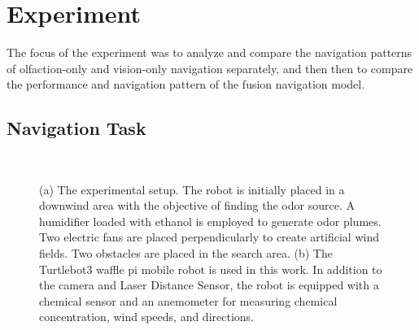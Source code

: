 
\section{Experiment}\label{Sec:fusionExperiment}

The focus of the experiment was to analyze and compare the navigation patterns of olfaction-only and vision-only navigation separately, and then then to compare the performance and navigation pattern of the fusion navigation model.

\subsection{Navigation Task}\label{Subsec:fusionNavigationTask}
\begin{figure}[h!] %
\ \\
\vspace*{-.18in}
\begin{center}
\hspace*{0.04in}
\hspace*{0.04in}
\end{center}
\vspace{-.1in}

\caption
{(a) The experimental setup. The robot is initially placed in a downwind area with the objective of finding the odor source. A humidifier loaded with ethanol is employed to generate odor plumes. Two electric fans are placed perpendicularly to create artificial wind fields. Two obstacles are placed in the search area. {(b)} The Turtlebot3 waffle pi mobile robot is used in this work. In addition to the camera and Laser Distance Sensor, the robot is equipped with a chemical sensor and an anemometer for measuring chemical concentration, wind speeds, and directions.}
\label{fig:search_area_real}
\end{figure}

